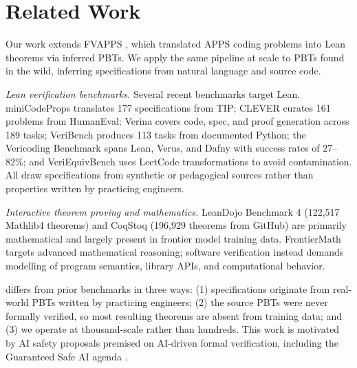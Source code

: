 \section{Related Work}
Our work extends FVAPPS \cite{dougherty2025proving}, which translated APPS \cite{hendrycks2021apps} coding problems into Lean theorems via inferred PBTs. We apply the same pipeline at scale to PBTs found in the wild, inferring specifications from natural language and source code.

\emph{Lean verification benchmarks.}
Several recent benchmarks target Lean. miniCodeProps \cite{brandfonbrener2024minicodeprops} translates 177 specifications from TIP; CLEVER \cite{thakur2025clever} curates 161 problems from HumanEval; Verina \cite{wu2025verina} covers code, spec, and proof generation across 189 tasks; VeriBench \cite{stechly2025veribench} produces 113 tasks from documented Python; the Vericoding Benchmark \cite{bursuc2025benchmark} spans Lean, Verus, and Dafny with success rates of 27--82\%; and VeriEquivBench \cite{ma2025veriequivbench} uses LeetCode transformations to avoid contamination. All draw specifications from synthetic or pedagogical sources rather than properties written by practicing engineers.

\emph{Interactive theorem proving and mathematics.}
LeanDojo Benchmark 4 \cite{hsiang2025leandojo} (122{,}517 Mathlib4 theorems) and CoqStoq \cite{thompson2024rango} (196{,}929 theorems from GitHub) are primarily mathematical and largely present in frontier model training data. FrontierMath \cite{glazer2024frontiermath} targets advanced mathematical reasoning; software verification instead demands modelling of program semantics, library APIs, and computational behavior.

\FVSpec differs from prior benchmarks in three ways: (1) specifications originate from real-world PBTs written by practicing engineers; (2) the source PBTs were never formally verified, so most resulting theorems are absent from training data; and (3) we operate at thousand-scale rather than hundreds. This work is motivated by AI safety proposals premised on AI-driven formal verification, including the Guaranteed Safe AI agenda \cite{dalrymple2024guaranteed}.

